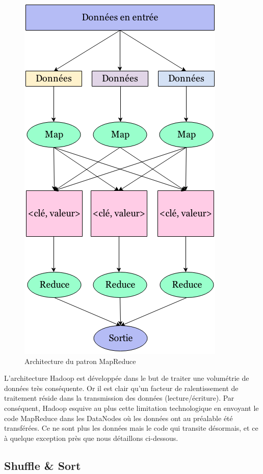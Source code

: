 \begin{figure}[h!]
  \centering
  \includegraphics[scale=0.4]{images/mapreduce_arch.png}
  \caption{Architecture du patron MapReduce}
  \label{fig:mapreduce-exp}
\end{figure}

\par L'architecture Hadoop est développée dans le but de traiter une volumétrie de données très conséquente. Or il est clair qu'un facteur de ralentissement de traitement réside dans la transmission des données (lecture/écriture). Par conséquent, Hadoop esquive au plus cette limitation technologique en envoyant le code MapReduce dans les DataNodes où les données ont au préalable été transférées. Ce ne sont plus les données mais le code qui transite désormais, et ce à quelque exception près que nous détaillons ci-dessous.

\subsection{Shuffle \& Sort}


